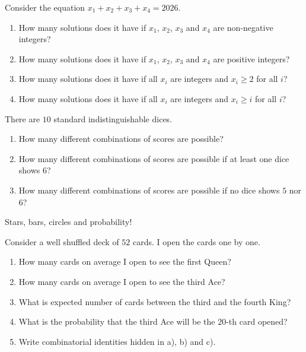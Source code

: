 \documentclass[12pt]{article}
\begin{document}
\begin{exercise}
Consider the equation $x_1 + x_2 + x_3 + x_4 = 2026$.

\begin{enumerate}[label=\alph*)]
\item How many solutions does it have if $x_1$, $x_2$, $x_3$ and $x_4$ are non-negative integers?
\item How many solutions does it have if $x_1$, $x_2$, $x_3$ and $x_4$ are positive integers?
\item How many solutions does it have if all $x_i$ are integers and $x_i \geq 2$ for all $i$?
\item How many solutions does it have if all $x_i$ are integers and $x_i \geq i$ for all $i$?
\end{enumerate}
\end{exercise}


\begin{exercise}
There are $10$ standard indistinguishable dices. 

\begin{enumerate}[label=\alph*)]
    \item How many different combinations of scores are possible?
    \item How many different combinations of scores are possible if at least one dice shows $6$?
    \item How many different combinations of scores are possible if no dice shows $5$ nor $6$?
\end{enumerate}
\end{exercise}

\begin{exercise}
Stars, bars, circles and probability!

Consider a well shuffled deck of $52$ cards. I open the cards one by one. 

\begin{enumerate}[label=\alph*)]
    \item How many cards on average I open to see the first Queen?
    \item How many cards on average I open to see the third Ace?
    \item What is expected number of cards between the third and the fourth King?
    \item What is the probability that the third Ace will be the $20$-th card opened?
    \item Write combinatorial identities hidden in a), b) and c).
\end{enumerate}
    
\end{exercise}
\end{document}
